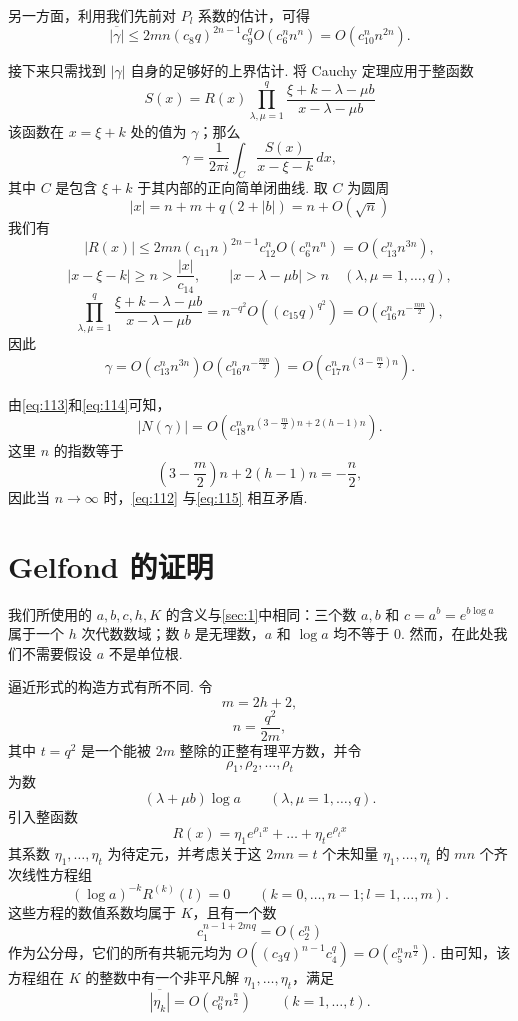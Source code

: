 另一方面，利用我们先前对 $P_l$ 系数的估计，可得
\begin{equation}
\overline{|\gamma|} \le 2mn(c_8 q)^{2n-1} c_9^q O(c_6^n n^n) = O(c_{10}^n n^{2n}). \tag{113}\label{eq:113}
\end{equation}

接下来只需找到 $|\gamma|$ 自身的足够好的上界估计. 将 Cauchy 定理应用于整函数
\[
S(x) = R(x) \prod_{\lambda, \mu = 1}^{q} \frac{\xi+k - \lambda - \mu b}{x - \lambda - \mu b}
\]
该函数在 $x = \xi + k$ 处的值为 $\gamma$；那么
\[
\gamma = \frac{1}{2\pi i} \int_{C} \frac{S(x)}{x - \xi - k} \, dx,
\]
其中 $C$ 是包含 $\xi + k$ 于其内部的正向简单闭曲线. 取 $C$ 为圆周
\[
|x| = n + m + q(2+|b|) = n + O(\sqrt{n})
\]
我们有
\[
|R(x)| \le 2mn(c_{11}n)^{2n-1} c_{12}^n O(c_6^n n^n) = O(c_{13}^n n^{3n}),
\]
\[
|x-\xi-k| \ge n > \frac{|x|}{c_{14}}, \qquad |x-\lambda-\mu b| > n \quad (\lambda, \mu=1,\dots,q),
\]
\[
\prod_{\lambda, \mu = 1}^{q} \frac{\xi+k-\lambda-\mu b}{x-\lambda-\mu b} = n^{-q^2} O((c_{15}q)^{q^2}) = O(c_{16}^n n^{-\frac{mn}{2}}),
\]
因此
\begin{equation}
\gamma = O(c_{13}^n n^{3n}) O(c_{16}^n n^{-\frac{mn}{2}}) = O(c_{17}^n n^{(3-\frac{m}{2})n}). \tag{114}\label{eq:114}
\end{equation}

由\eqref{eq:113}和\eqref{eq:114}可知，
\begin{equation}
|N(\gamma)| = O\left(c_{18}^n n^{(3-\frac{m}{2})n+2(h-1)n}\right). \tag{115}\label{eq:115}
\end{equation}
这里 $n$ 的指数等于
\[
(3 - \frac{m}{2}) n + 2(h-1)n = -\frac{n}{2},
\]
因此当 $n \to \infty$ 时，\eqref{eq:112} 与\eqref{eq:115} 相互矛盾.

\section{Gelfond 的证明}\label{sec:2}

我们所使用的 $a, b, c, h, K$ 的含义与\autoref{sec:1}中相同：三个数 $a, b$ 和 $c = a^b = e^{b \log a}$ 属于一个 $h$ 次代数数域；数 $b$ 是无理数，$a$ 和 $\log a$ 均不等于 0. 然而，在此处我们不需要假设 $a$ 不是单位根.

逼近形式的构造方式有所不同. 令
\[
m = 2h + 2,
\]
\[
n = \frac{q^2}{2m},
\]
其中 $t = q^2$ 是一个能被 $2m$ 整除的正整有理平方数，并令
\[
\rho_1, \rho_2, \dots, \rho_t
\]
为数
\[
(\lambda + \mu b) \log a \qquad (\lambda, \mu = 1, \dots, q).
\]
引入整函数
\[
R(x) = \eta_1 e^{\rho_1 x} + \dots + \eta_t e^{\rho_t x}
\]
其系数 $\eta_1, \dots, \eta_t$ 为待定元，并考虑关于这 $2mn = t$ 个未知量 $\eta_1, \dots, \eta_t$ 的 $mn$ 个齐次线性方程组
\[
(\log a)^{-k} R^{(k)}(l) = 0 \qquad (k=0,\dots,n-1; l=1,\dots,m).
\]
这些方程的数值系数均属于 $K$，且有一个数
\[
c_1^{n-1+2mq} = O(c_2^n)
\]
作为公分母，它们的所有共轭元均为 $O((c_3 q)^{n-1} c_4^q) = O(c_5^n n^{\frac{n}{2}})$. 由可知，该方程组在 $K$ 的整数中有一个非平凡解 $\eta_1, \dots, \eta_t$，满足
\[
\overline{|\eta_k|} = O(c_6^n n^{\frac{n}{2}}) \qquad (k=1,\dots,t).
\]

